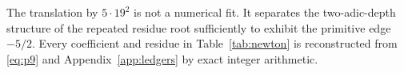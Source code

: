\begin{remark}
The translation by \(5\cdot19^2\) is not a numerical fit.  It separates
the two-adic-depth structure of the repeated residue root sufficiently to
exhibit the primitive edge \(-5/2\).  Every coefficient and residue in
Table~\ref{tab:newton} is reconstructed from \eqref{eq:p9} and
Appendix~\ref{app:ledgers} by exact integer arithmetic.
\end{remark}
